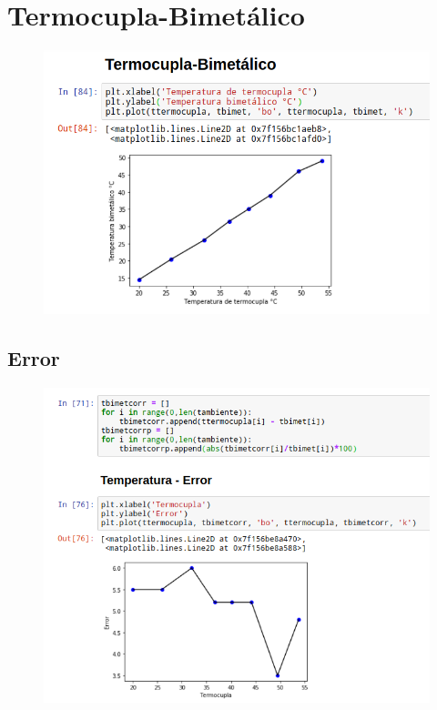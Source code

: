 \documentclass[a4paper,11pt]{report}
\begin{document}
\section{Termocupla-Bimetálico}
\begin{figure}[H]
\includegraphics[scale=0.52]{pbimet1.png}
\end{figure}
\subsection{Error}
\begin{figure}[H]
\includegraphics[scale=0.65]{pbimet2.png}
\end{figure}
\end{document}
